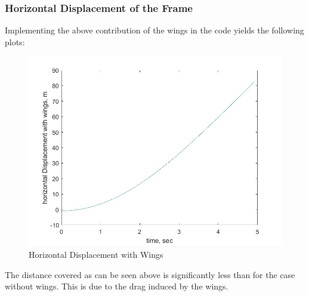 \subsubsection{Horizontal Displacement of the Frame}   
Implementing the above contribution of the wings in the code yields the following plots: 

\begin{figure}[ht]
    \centering
    \includegraphics[scale=0.4]{images/horizontal_displacement_wings.jpg}
    \caption{Horizontal Displacement with Wings}
    \label{fig:horizontal_wings}
\end{figure}
The distance covered as can be seen above is significantly less than for the case without wings. This is due to the drag induced by the wings.
\clearpage %
